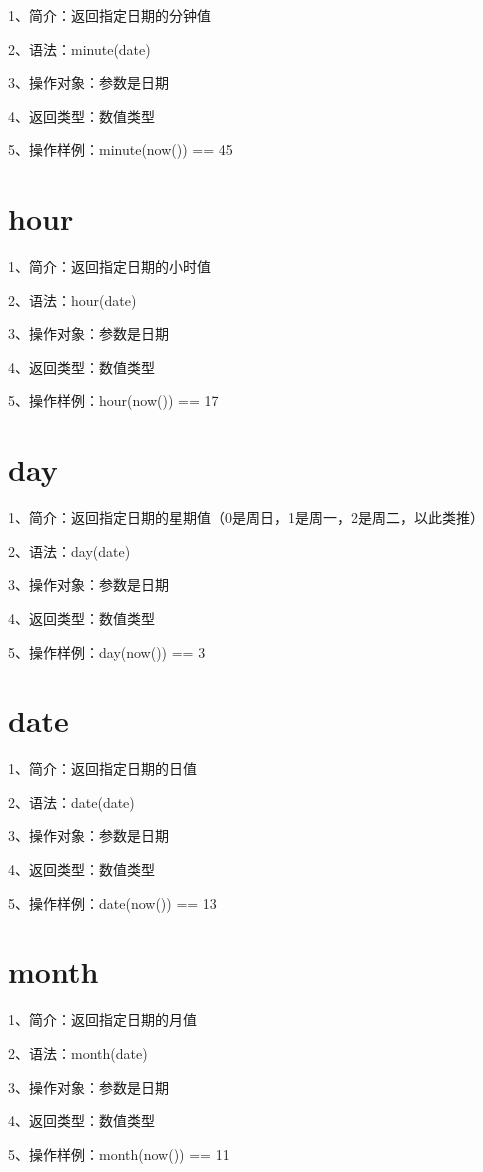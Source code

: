 1、简介：返回指定日期的分钟值

2、语法：minute(date)

3、操作对象：参数是日期

4、返回类型：数值类型

5、操作样例：minute(now()) == 45

\section{hour}

1、简介：返回指定日期的小时值

2、语法：hour(date)

3、操作对象：参数是日期

4、返回类型：数值类型

5、操作样例：hour(now()) == 17

\section{day}

1、简介：返回指定日期的星期值（0是周日，1是周一，2是周二，以此类推）

2、语法：day(date)

3、操作对象：参数是日期

4、返回类型：数值类型

5、操作样例：day(now()) == 3

\section{date}

1、简介：返回指定日期的日值

2、语法：date(date)

3、操作对象：参数是日期

4、返回类型：数值类型

5、操作样例：date(now()) == 13

\section{month}

1、简介：返回指定日期的月值

2、语法：month(date)

3、操作对象：参数是日期

4、返回类型：数值类型

5、操作样例：month(now()) == 11

